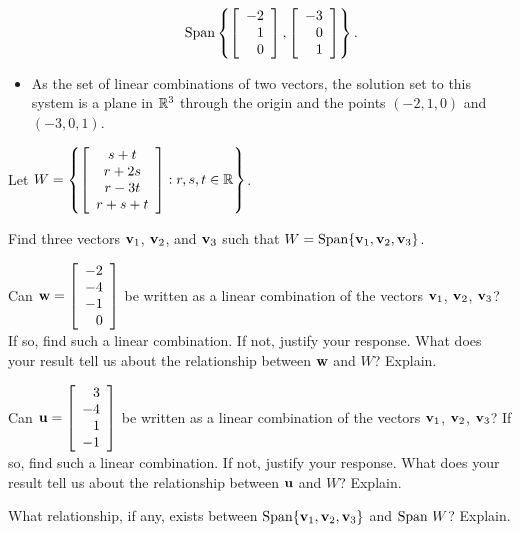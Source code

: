 \begin{example}
\begin{itemize}
	\[\text{Span}\left\{\left[ \begin{array}{r} -2\\1\\0 \end{array} \right], \left[ \begin{array}{r} -3\\0\\1 \end{array} \right] \right\}.\] 
	\item As the set of linear combinations of two vectors, the solution set to this system is a plane in $\mathbb{R}^3$  through the origin and the points $(-2,1,0)$ and $(-3,0,1)$. 
	\end{itemize} 
\ea
\end{example}

\begin{example} \label{example:1_d_span} Let $W = \left\{\left[ \begin{array}{c} s+t \\ r+2s \\ r-3t \\ r+s+t \end{array} \right] : r,s,t \in \mathbb{R} \right\}$. 
	\ba
	\item Find three vectors $\mathbf{v}_1$, $\mathbf{v}_2$, and $\mathbf{v}_3$ such that $W = \text{Span}\{\mathbf{v}_1, \mathbf{v}_2, \mathbf{v}_3\}$. 
	\item Can $\mathbf{w} = \left[ \begin{array}{r} -2\\-4\\-1\\0 \end{array} \right]$ be written as a linear combination of the vectors $\mathbf{v}_1$, $\mathbf{v}_2$, $\mathbf{v}_3$? If so, find such a linear combination. If not, justify your response. What does your result tell us about the relationship between $\mathbf{w}$ and $W$? Explain. 
	\item  Can $\mathbf{u} = \left[ \begin{array}{r} 3\\-4\\1\\-1 \end{array} \right]$ be written as a linear combination of the vectors $\mathbf{v}_1$, $\mathbf{v}_2$, $\mathbf{v}_3$? If so, find such a linear combination. If not, justify your response. What does your result tell us about the relationship between $\mathbf{u}$ and $W$? Explain.
	\item What relationship, if any, exists between $\text{Span}\{\mathbf{v}_1, \mathbf{v}_2, \mathbf{v}_3\}$ and $\text{Span} \ W$? Explain. 
	\ea


\end{example}
